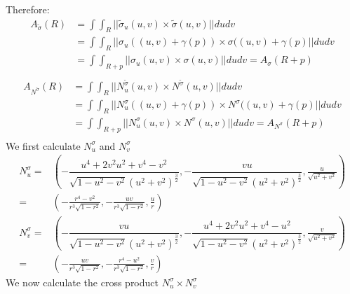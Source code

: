 \documentclass{article}
\begin{document}
\begin{enumerate}
\begin{itemize}
        \end{itemize}
        Therefore: 
        \begin{align*}
            A_{{\tilde{\sigma}}}(R)&=\int\int_R ||{\tilde{\sigma}}_u(u,v)\times {\tilde{\sigma}}(u,v)||dudv\\
            &=\int\int_R ||{{\sigma}}_u((u,v)+\gamma(p))\times {{\sigma}}((u,v)+\gamma(p)||dudv\\
            &=\int\int_{R+p} ||{{\sigma}}_u(u,v)\times {{\sigma}}(u,v)||dudv=A_{\sigma}(R+p)\\  
        \end{align*}
        \begin{align*}
            A_{N^{\tilde{\sigma}}}(R)&=\int\int_R ||N^{\tilde{\sigma}}_u(u,v)\times N^{\tilde{\sigma}}(u,v)||dudv\\
            &=\int\int_R ||N^{{\sigma}}_u((u,v)+\gamma(p))\times N^{{\sigma}}((u,v)+\gamma(p)||dudv\\
            &=\int\int_{R+p} ||N^{{\sigma}}_u(u,v)\times N^{{\sigma}}(u,v)||dudv=A_{N^\sigma}(R+p)\\  
        \end{align*}
        We first calculate $N^\sigma_u$ and $N^\sigma_v$
            \begin{align*}
                N^\sigma_u=&\left(-\dfrac{u^4+2v^2u^2+v^4-v^2}{\sqrt{1-u^2-v^2}\left(u^2+v^2\right)^\frac{3}{2}},-\dfrac{vu}{\sqrt{1-u^2-v^2}\left(u^2+v^2\right)^\frac{3}{2}},\frac{u}{\sqrt{u^2+v^2}}\right)\\
                =&\left(-\frac{r^4-v^2}{r^3\sqrt{1-r^2}},-\frac{uv}{r^3\sqrt{1-r^2}},\frac{u}{r}\right)
            \end{align*}
            \begin{align*}
                N^\sigma_v=&\left(-\dfrac{vu}{\sqrt{1-u^2-v^2}\left(u^2+v^2\right)^\frac{3}{2}},-\dfrac{u^4+2v^2u^2+v^4-u^2}{\sqrt{1-u^2-v^2}\left(u^2+v^2\right)^\frac{3}{2}},\frac{v}{\sqrt{u^2+v^2}}\right)\\
                =&\left(-\frac{uv}{r^3\sqrt{1-r^2}},-\frac{r^4-u^2}{r^3\sqrt{1-r^2}},\frac{v}{r}\right)
            \end{align*}
            We now calculate the cross product $N^\sigma_u\times N^\sigma_v$


\end{enumerate}
\end{document}
